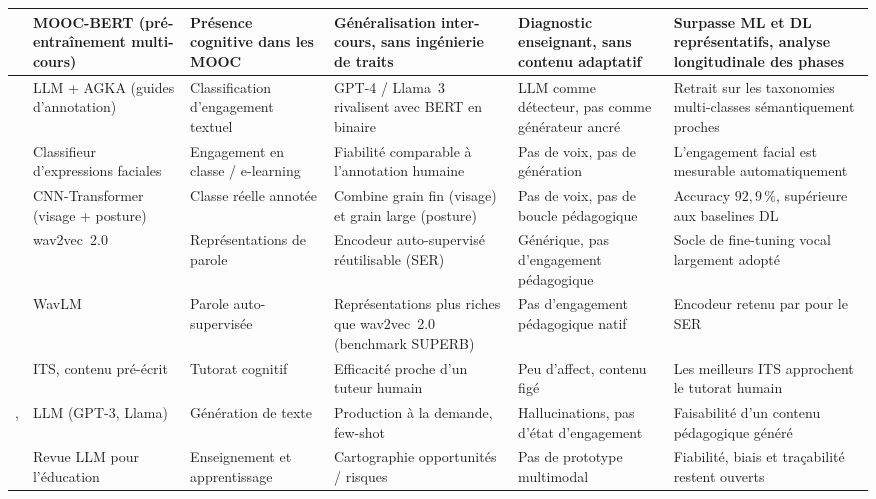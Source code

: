 {\begin{xltabular}{\textwidth}{|>{\raggedright\arraybackslash}X|>{\raggedright\arraybackslash}X|>{\raggedright\arraybackslash}X|>{\raggedright\arraybackslash}X|>{\raggedright\arraybackslash}X|>{\raggedright\arraybackslash}X|}
\hline
\textcite{liu2023moocbert}
  & MOOC-BERT (pré-entraînement multi-cours)
  & Présence cognitive dans les MOOC
  & Généralisation inter-cours, sans ingénierie de traits
  & Diagnostic enseignant, sans contenu adaptatif
  & Surpasse ML et DL représentatifs, analyse longitudinale des phases \\
\hline
\textcite{liu2025agka}
  & LLM + AGKA (guides d'annotation)
  & Classification d'engagement textuel
  & GPT-4 / Llama~3 rivalisent avec BERT en binaire
  & LLM comme détecteur, pas comme générateur ancré
  & Retrait sur les taxonomies multi-classes sémantiquement proches \\
\hline
\textcite{whitehill2014faces}
  & Classifieur d'expressions faciales
  & Engagement en classe / e-learning
  & Fiabilité comparable à l'annotation humaine
  & Pas de voix, pas de génération
  & L'engagement facial est mesurable automatiquement \\
\hline
\textcite{xiong2024cnntransformer}
  & CNN-Transformer (visage + posture)
  & Classe réelle annotée
  & Combine grain fin (visage) et grain large (posture)
  & Pas de voix, pas de boucle pédagogique
  & Accuracy $92{,}9\,\%$, supérieure aux baselines DL \\
\hline
\textcite{baevski2020wav2vec2}
  & wav2vec~2.0
  & Représentations de parole
  & Encodeur auto-supervisé réutilisable (SER)
  & Générique, pas d'engagement pédagogique
  & Socle de fine-tuning vocal largement adopté \\
\hline
\textcite{chen2022wavlm}
  & WavLM
  & Parole auto-supervisée
  & Représentations plus riches que wav2vec~2.0 (benchmark SUPERB)
  & Pas d'engagement pédagogique natif
  & Encodeur retenu par \emolearn{} pour le SER \\
\hline
\textcite{vanlehn2011relative}
  & ITS, contenu pré-écrit
  & Tutorat cognitif
  & Efficacité proche d'un tuteur humain
  & Peu d'affect, contenu figé
  & Les meilleurs ITS approchent le tutorat humain \\
\hline
\textcite{brown2020language}, \textcite{touvron2023llama}
  & LLM (GPT-3, Llama)
  & Génération de texte
  & Production à la demande, few-shot
  & Hallucinations, pas d'état d'engagement
  & Faisabilité d'un contenu pédagogique généré \\
\hline
\textcite{kasneci2023chatgpt}
  & Revue LLM pour l'éducation
  & Enseignement et apprentissage
  & Cartographie opportunités / risques
  & Pas de prototype multimodal
  & Fiabilité, biais et traçabilité restent ouverts \\
\hline

\end{xltabular}}
